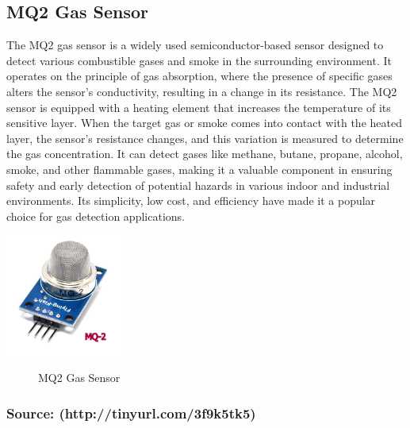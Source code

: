 \documentclass[12pt,a4paper]{report}
\begin{document}
	\subsection{MQ2 Gas Sensor }
	\begin{justify}
		The MQ2 gas sensor is a widely used semiconductor-based sensor designed to detect various combustible gases and smoke in the surrounding environment. It operates on the principle of gas absorption, where the presence of specific gases alters the sensor's conductivity, resulting in a change in its resistance. The MQ2 sensor is equipped with a heating element that increases the temperature of its sensitive layer. When the target gas or smoke comes into contact with the heated layer, the sensor's resistance changes, and this variation is measured to determine the gas concentration. It can detect gases like methane, butane, propane, alcohol, smoke, and other flammable gases, making it a valuable component in ensuring safety and early detection of potential hazards in various indoor and industrial environments. Its simplicity, low cost, and efficiency have made it a popular choice for gas detection applications.
	\end{justify}
	
	\begin{center}
		\includegraphics[width=0.3\textwidth]{images//mq2_gas_sensor.jpg} \\
		
		\begin{figure}[ht]
			
			
			\caption{MQ2 Gas Sensor}
			\label{MQ2 Gas Sensor}
		\end{figure}
		\vspace{-20pt}
		\subsubsection{Source: (http://tinyurl.com/3f9k5tk5)}
	\end{center}
	
	
	
	
\end{document}
